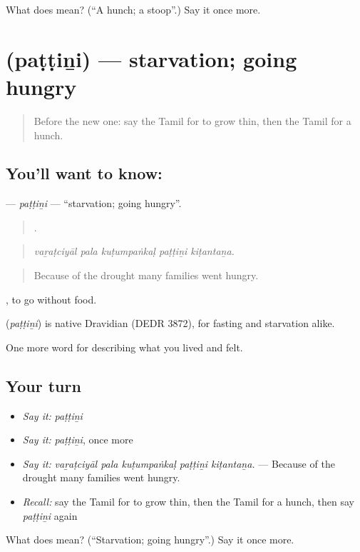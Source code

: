 \begin{tcolorbox}[breakable,colback=teal!4,colframe=teal!35!black,title={Before you move on}]
What does  mean? (\textquotedblleft{}A hunch; a stoop\textquotedblright{}.) Say it once more.
\end{tcolorbox}
\section[\texorpdfstring{\ta{பட்டினி} (paṭṭiṉi)}{பட்டினி (paṭṭiṉi)}]{ (paṭṭiṉi) — starvation; going hungry}

\label{lesson:TA-C488-pattini}



\begin{quote}
Before the new one: say the Tamil for to grow thin, then the Tamil for a hunch.
\end{quote}

\subsection*{You'll want to know: }
\textbf{} — \emph{paṭṭiṉi} — \textquotedblleft{}starvation; going hungry\textquotedblright{}.

\begin{quote}
    .
\end{quote}

\begin{quote}
\emph{vaṟaṭciyāl pala kuṭumpaṅkaḷ paṭṭiṉi kiṭantaṉa.}
\end{quote}

\begin{quote}
Because of the drought many families went hungry.
\end{quote}

 , to go without food.

\begin{cousinweb}
\textbf{} (\emph{paṭṭiṉi}) is native Dravidian (DEDR 3872), for fasting and starvation alike.
\end{cousinweb}

\begin{grammarlens}[title={What you've built}]
One more word for describing what you lived and felt.
\end{grammarlens}

\subsection*{Your turn}
\begin{itemize}
\raggedright
  \item \emph{Say it:} \emph{paṭṭiṉi}
  \item \emph{Say it:} \emph{paṭṭiṉi}, once more
  \item \emph{Say it:} \emph{vaṟaṭciyāl pala kuṭumpaṅkaḷ paṭṭiṉi kiṭantaṉa.} — Because of the drought many families went hungry.
  \item \emph{Recall:} say the Tamil for to grow thin, then the Tamil for a hunch, then say \emph{paṭṭiṉi} again
\end{itemize}

\begin{tcolorbox}[breakable,colback=teal!4,colframe=teal!35!black,title={Before you move on}]
What does  mean? (\textquotedblleft{}Starvation; going hungry\textquotedblright{}.) Say it once more.
\end{tcolorbox}
